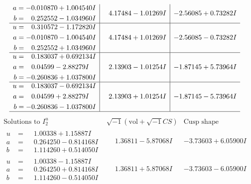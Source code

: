 \documentclass[1p]{elsarticle_modified}
\theoremstyle{definition}
\newcommand{\I}{\sqrt{-1}}
\begin{document}
$$\begin{array}{c|c|c}
\begin{aligned}
a &= -0.010870 + 1.004540 I \\
b &= \phantom{-}0.252552 - 1.034960 I\end{aligned}
 & \phantom{-}4.17484 - 1.01269 I & -2.56085 + 0.73282 I \\ \hline\begin{aligned}
u &= \phantom{-}0.310572 - 1.172820 I \\
a &= -0.010870 - 1.004540 I \\
b &= \phantom{-}0.252552 + 1.034960 I\end{aligned}
 & \phantom{-}4.17484 + 1.01269 I & -2.56085 - 0.73282 I \\ \hline\begin{aligned}
u &= \phantom{-}0.183037 + 0.692134 I \\
a &= \phantom{-}0.04599 - 2.88279 I \\
b &= -0.260836 + 1.037800 I\end{aligned}
 & \phantom{-}2.13903 - 1.01254 I & -1.87145 + 5.73964 I \\ \hline\begin{aligned}
u &= \phantom{-}0.183037 - 0.692134 I \\
a &= \phantom{-}0.04599 + 2.88279 I \\
b &= -0.260836 - 1.037800 I\end{aligned}
 & \phantom{-}2.13903 + 1.01254 I & -1.87145 - 5.73964 I\\
 \hline 
 \end{array}$$\newpage$$\begin{array}{c|c|c}  
\text{Solutions to }I^u_{2}& \I (\text{vol} + \sqrt{-1}CS) & \text{Cusp shape}\\
 \hline 
\begin{aligned}
u &= \phantom{-}1.00338 + 1.15887 I \\
a &= \phantom{-}0.264250 - 0.814168 I \\
b &= \phantom{-}1.114260 + 0.514050 I\end{aligned}
 & \phantom{-}1.36811 - 5.87068 I & -3.73603 + 6.05900 I \\ \hline\begin{aligned}
u &= \phantom{-}1.00338 - 1.15887 I \\
a &= \phantom{-}0.264250 + 0.814168 I \\
b &= \phantom{-}1.114260 - 0.514050 I\end{aligned}
 & \phantom{-}1.36811 + 5.87068 I & -3.73603 - 6.05900 I \\ \hline\begin{aligned}

\end{aligned}
\end{array}$$
\end{document}
